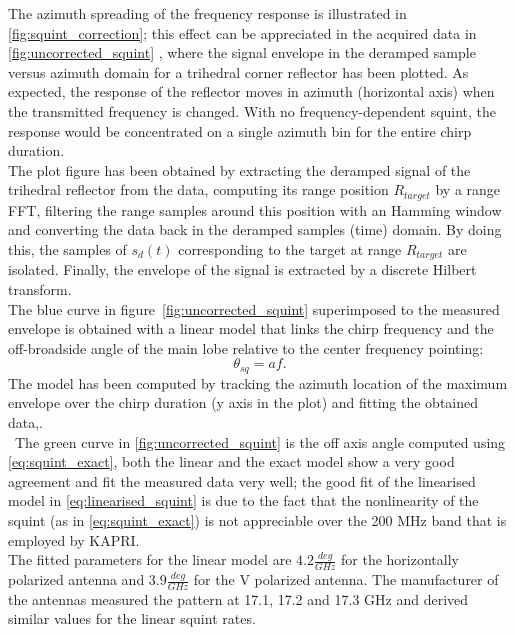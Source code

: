 The azimuth spreading of the frequency response is illustrated in \autoref{fig:squint_correction}; this effect can be appreciated in the acquired data in \autoref{fig:uncorrected_squint} , where the signal envelope in the deramped sample versus azimuth domain for a trihedral corner reflector has been plotted. As expected, the response of the reflector moves in azimuth (horizontal axis) when the transmitted frequency is changed. With no frequency-dependent squint, the response would be concentrated on a single azimuth bin for the entire chirp duration.\\ The plot figure has been obtained by extracting the deramped signal of the trihedral reflector from the data, computing its range position $R_{target}$ by a range FFT, filtering the range samples around this position with an Hamming window and converting the data back in the deramped samples (time) domain. By doing this, the samples of $s_{d}\left(t\right)$ corresponding to the target at range $R_{target}$ are isolated. Finally, the envelope of the signal is extracted by a discrete Hilbert transform.\\
The blue curve in figure~\ref{fig:uncorrected_squint} superimposed to the measured envelope is obtained with a linear model that links the chirp frequency and the off-broadside angle of the main lobe relative to the center frequency pointing:
\begin{equation}\label{eq:linearised_squint}
	\theta_{sq} = a f.
\end{equation}
The model has been computed by tracking the azimuth location of the maximum envelope over the chirp duration (y axis in the plot) and fitting the obtained data,.\\\
The green curve in  \autoref{fig:uncorrected_squint} is the off axis angle computed using \autoref{eq:squint_exact},
both the linear and the exact model show a very good agreement and fit the measured data very well; the good fit of the linearised model in \autoref{eq:linearised_squint} is  due to the fact that the nonlinearity of the squint (as in \autoref{eq:squint_exact}) is not appreciable over the 200 MHz band that is employed by KAPRI.\\
The fitted parameters for the linear model are $4.2\frac{deg}{GHz}$ for the horizontally polarized antenna and $3.9 \frac{deg}{GHz}$ for the V polarized antenna. The manufacturer of the antennas measured the pattern at 17.1, 17.2 and 17.3 GHz and derived similar values for the linear squint rates.\\

